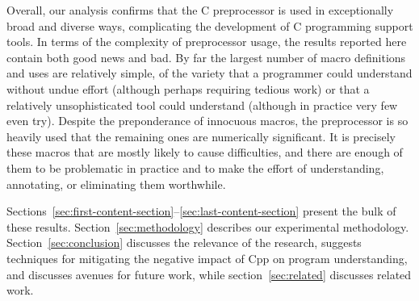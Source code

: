\documentclass[10pt]{article}
\begin{document}
Overall, our analysis confirms that the C preprocessor is used in
exceptionally broad and diverse ways, complicating the development of
C programming support tools.  In terms of the complexity of
preprocessor usage, the results reported here contain both good news
and bad.  By far the largest number of macro definitions and uses are
relatively simple, of the variety that a programmer could understand
without undue effort (although perhaps requiring tedious work) or that
a relatively unsophisticated tool could understand (although in
practice very few even try).  Despite the preponderance of innocuous
macros, the preprocessor is so heavily used that the remaining ones
are numerically significant.  It is precisely these macros that are
mostly likely to cause difficulties, and there are enough of them to
be problematic in practice and to make the effort of understanding,
annotating, or eliminating them worthwhile.

Sections~\ref{sec:first-content-section}--\ref{sec:last-content-section}
present the bulk of these results.  Section~\ref{sec:methodology}
describes our experimental methodology.  Section~\ref{sec:conclusion}
discusses the relevance of the research, suggests techniques for
mitigating the negative impact of Cpp on program understanding, and
discusses avenues for future work, while section~\ref{sec:related}
discusses related work.

\end{document}
